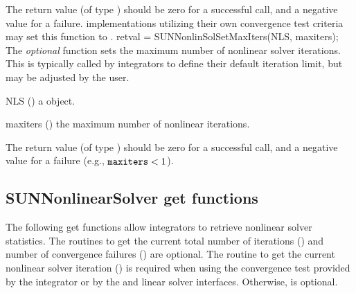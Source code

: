 {
  The return value  (of type ) should be zero for a
  successful call, and a negative value for a failure.
}
{
  {\sunnonlinsol} implementations utilizing their own convergence test
  criteria may set this function to .
}
{
  retval = SUNNonlinSolSetMaxIters(NLS, maxiters);
}
{
  The \textit{optional} function  sets the maximum
  number of nonlinear solver iterations. This is typically called by
  {\sundials} integrators to define their default iteration limit, but may be
  adjusted by the user.
}
{
  \begin{args}[maxiters]
  \item[NLS] ()
    a {\sunnonlinsol} object.
  \item[maxiters] ()
    the maximum number of nonlinear iterations.
  \end{args}
}
{
  The return value  (of type ) should be zero for a
  successful call, and a negative value for a failure
  (e.g., ${\tt maxiters} < 1$).
}
{}


\subsection{SUNNonlinearSolver get functions}
\label{ss:sunnonlinsol_getfn}
The following get functions allow {\sundials} integrators to retrieve nonlinear
solver statistics. The routines to get the current total number of
iterations () and number of convergence failures
() are optional. The routine to get
the current nonlinear solver iteration () is required
when using the convergence test provided by the {\sundials} integrator
or by the {\arkode} and {\cvode} linear solver interfaces.  Otherwise,
 is optional.

